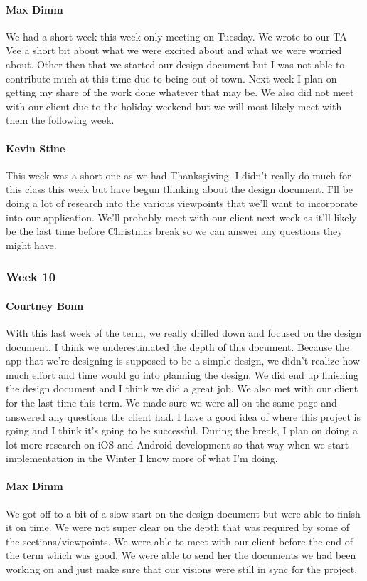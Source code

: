 			\paragraph{Max Dimm}
			We had a short week this week only meeting on Tuesday. We wrote to our TA Vee a short bit about what we were excited about and what we were worried about. Other then that we started our design document but I was not able to contribute much at this time due to being out of town. Next week I plan on getting my share of the work done whatever that may be. We also did not meet with our client due to the holiday weekend but we will most likely meet with them the following week.

			\paragraph{Kevin Stine}
			This week was a short one as we had Thanksgiving. I didn't really do much for this class this week but have begun thinking about the design document. I'll be doing a lot of research into the various viewpoints that we'll want to incorporate into our application. We'll probably meet with our client next week as it'll likely be the last time before Christmas break so we can answer any questions they might have.

		\subsubsection{Week 10}

			\paragraph{Courtney Bonn}
			With this last week of the term, we really drilled down and focused on the design document. I think we underestimated the depth of this document. Because the app that we're designing is supposed to be a simple design, we didn't realize how much effort and time would go into planning the design. We did end up finishing the design document and I think we did a great job. We also met with our client for the last time this term. We made sure we were all on the same page and answered any questions the client had. I have a good idea of where this project is going and I think it's going to be successful. During the break, I plan on doing a lot more research on iOS and Android development so that way when we start implementation in the Winter I know more of what I'm doing.

			\paragraph{Max Dimm}
			We got off to a bit of a slow start on the design document but were able to finish it on time. We were not super clear on the depth that was required by some of the sections/viewpoints. We were able to meet with our client before the end of the term which was good. We were able to send her the documents we had been working on and just make sure that our visions were still in sync for the project.

